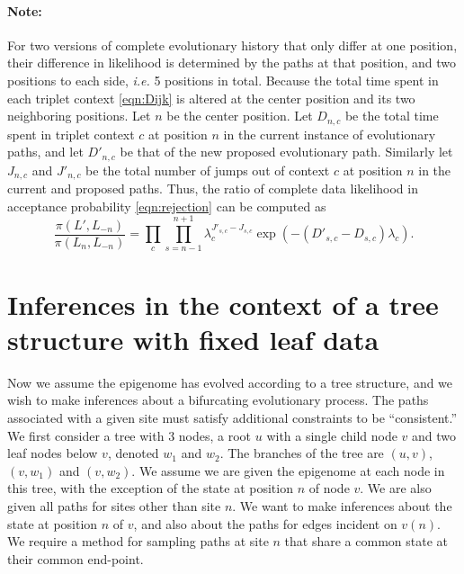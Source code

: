 \documentclass[11pt]{article}
\begin{document}
\paragraph{Note:} For two versions of complete evolutionary history
that only differ at one position, their difference in likelihood is
determined by the paths at that position, and two positions to each
side, \textit{i.e.} 5 positions in total. Because the total time spent
in each triplet context \eqref{eqn:Dijk} is altered at the center
position and its two neighboring positions. Let $n$  be the center position. 
Let $D_{n,c}$ be the total time spent in triplet context $c$ at position $n$
in the current instance of evolutionary paths, and let $D'_{n,c}$ be that of 
the new proposed evolutionary path. Similarly let $J_{n,c}$ and $J'_{n,c}$ be 
the total number of jumps out of context $c$ at position $n$ in the
current and proposed paths. Thus, the ratio of complete data
likelihood in acceptance probability \eqref{eqn:rejection} can be
computed as
\[
\frac{\pi(L', L_{-n})}{\pi(L_n, L_{-n})} = \prod\limits_{c}\prod\limits_{s=n-1}^{n+1}
\lambda_c^{J'_{s,c} - J_{s,c}} \exp(-(D'_{s,c}-D_{s,c})\lambda_c).
\]



\section{Inferences in the context of a tree structure with fixed leaf data}

Now we assume the epigenome has evolved according to a tree structure,
and we wish to make inferences about a bifurcating evolutionary
process. The paths associated with a given site must satisfy
additional constraints to be ``consistent.'' We first consider a tree
with 3 nodes, a root $u$ with a single child node $v$ and two leaf
nodes below $v$, denoted $w_1$ and $w_2$. The branches of the tree are
$(u, v)$, $(v, w_1)$ and $(v, w_2)$. We assume we are given the
epigenome at each node in this tree, with the exception of the state
at position $n$ of node $v$. We are also given all paths for sites
other than site $n$. We want to make inferences about the state at
position $n$ of $v$, and also about the paths for edges incident on
$v(n)$. We require a method for sampling paths at site $n$ that share
a common state at their common end-point.
\end{document}
